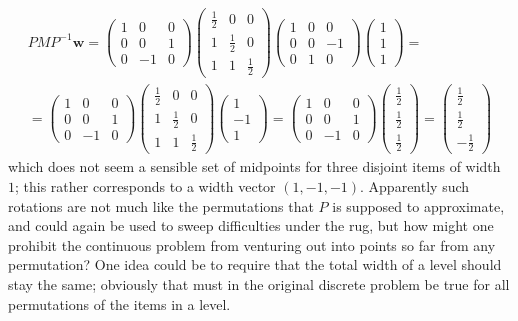 \documentclass{article}
\newcommand{\vek}{\mathbf}
\theoremstyle{definition}
\begin{document}
\begin{multline*}
  P M P^{-1} \vek{w} =
  \begin{pmatrix} 1&0&0 \\ 0&0&1 \\ 0&-1&0 \end{pmatrix}
  \begin{pmatrix} \frac{1}{2} & 0 & 0\\ 1 & \frac{1}{2} & 0 \\
    1 & 1 & \frac{1}{2} \end{pmatrix}
  \begin{pmatrix} 1&0&0 \\ 0&0&-1 \\ 0&1&0 \end{pmatrix}
  \begin{pmatrix} 1 \\ 1 \\ 1 \end{pmatrix}
  = \\ =
  \begin{pmatrix} 1&0&0 \\ 0&0&1 \\ 0&-1&0 \end{pmatrix}
  \begin{pmatrix} \frac{1}{2} & 0 & 0\\ 1 & \frac{1}{2} & 0 \\
    1 & 1 & \frac{1}{2} \end{pmatrix}
  \begin{pmatrix} 1 \\ -1 \\ 1 \end{pmatrix}
  = 
  \begin{pmatrix} 1&0&0 \\ 0&0&1 \\ 0&-1&0 \end{pmatrix}
  \begin{pmatrix} \frac{1}{2} \\ \frac{1}{2} \\ \frac{1}{2} \end{pmatrix}
  = 
  \begin{pmatrix} \frac{1}{2} \\ \frac{1}{2} \\ -\frac{1}{2} \end{pmatrix}
\end{multline*}
which does not seem a sensible set of midpoints for three disjoint 
items of width $1$; this rather corresponds to a width vector 
$(1,-1,-1)$. Apparently such rotations are not much like the 
permutations that $P$ is supposed to approximate, and could again be 
used to sweep difficulties under the rug, but how might one prohibit 
the continuous problem from venturing out into points so far from any 
permutation? One idea could be to require that the total width of a 
level should stay the same; obviously that must in the original 
discrete problem be true for all permutations of the items in a level.
\end{document}
